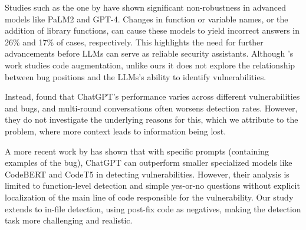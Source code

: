 	Studies such as the one by \citet{ullah2024llms} have shown significant non-robustness in advanced models like PaLM2 and GPT-4. Changes in function or variable names, or the addition of library functions, can cause these models to yield incorrect answers in 26\% and 17\% of cases, respectively. This highlights the need for further advancements before \acp{LLM} can serve as reliable security assistants. Although \citeauthor{ullah2024llms}'s work \cite{ullah2024llms} studies code augmentation, unlike ours it does not explore the relationship between bug positions and the \acp{LLM}'s ability to identify vulnerabilities.
	
	Instead, \citet{DBLP:journals/corr/abs-2309-05520} found that ChatGPT's performance varies across different vulnerabilities and bugs, and multi-round conversations often worsens detection rates. However, they do not investigate the underlying reasons for this, which we attribute to the  problem, where more context leads to information being lost.
	
	
	A more recent work by \citet{DBLP:journals/corr/abs-2401-15468} has shown that with specific prompts (containing examples of the bug), ChatGPT can outperform smaller specialized models like CodeBERT \cite{DBLP:conf/emnlp/FengGTDFGS0LJZ20} and CodeT5 \cite{DBLP:conf/emnlp/0034WJH21} in detecting vulnerabilities. However, their analysis is limited to function-level detection and simple yes-or-no questions without explicit localization of the main line of code responsible for the vulnerability. Our study extends to in-file detection, using post-fix code as negatives, making the detection task more challenging and realistic.
	
	
